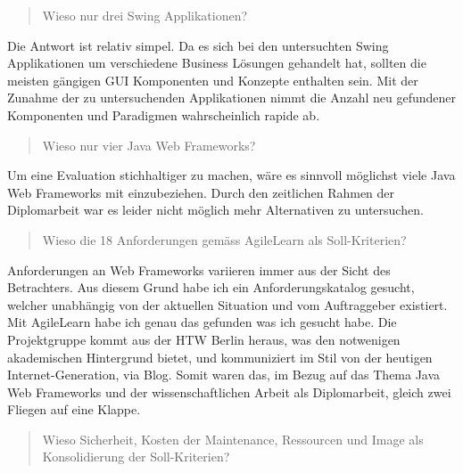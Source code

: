 \begin{quote}\begin{itshape}Wieso nur drei Swing
Applikationen?\end{itshape}\end{quote}

Die Antwort ist relativ simpel. Da es sich bei den untersuchten Swing
Applikationen um verschiedene Business Lösungen gehandelt hat, sollten die
meisten gängigen GUI Komponenten und Konzepte enthalten sein. Mit der Zunahme
der zu untersuchenden Applikationen nimmt die Anzahl neu gefundener Komponenten
und Paradigmen wahrscheinlich rapide ab.
\newline

\begin{quote}\begin{itshape}Wieso nur vier Java Web
Frameworks?\end{itshape}\end{quote}

Um eine Evaluation stichhaltiger zu machen, wäre es sinnvoll möglichst viele
Java Web Frameworks mit einzubeziehen. Durch den zeitlichen Rahmen der
Diplomarbeit war es leider nicht möglich mehr Alternativen zu untersuchen.
\newline

\begin{quote}\begin{itshape}Wieso die 18 Anforderungen gemäss AgileLearn als
Soll-Kriterien?\end{itshape}\end{quote}

Anforderungen an Web Frameworks variieren immer aus der Sicht des Betrachters.
Aus diesem Grund habe ich ein Anforderungskatalog gesucht, welcher unabhängig
von der aktuellen Situation und vom Auftraggeber existiert. Mit AgileLearn habe
ich genau das gefunden was ich gesucht habe. Die Projektgruppe kommt aus der HTW
Berlin heraus, was den notwenigen akademischen Hintergrund bietet, und
kommuniziert im Stil von der heutigen Internet-Generation, via Blog. Somit waren
das, im Bezug auf das Thema Java Web Frameworks und der wissenschaftlichen
Arbeit als Diplomarbeit, gleich zwei Fliegen auf eine Klappe.
\newline

\begin{quote}\begin{itshape}Wieso Sicherheit, Kosten der Maintenance, Ressourcen
und Image als Konsolidierung der Soll-Kriterien?\end{itshape}\end{quote}

